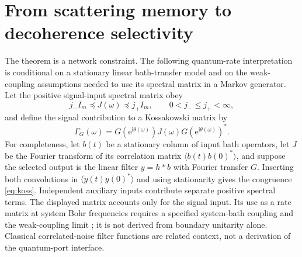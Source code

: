 \documentclass[11pt]{article}
\theoremstyle{definition}
\theoremstyle{remark}
\newcommand{\e}{\mathrm{e}}
\begin{document}
\section{From scattering memory to decoherence selectivity}

The theorem is a network constraint. The following quantum-rate interpretation
is conditional on a stationary linear bath-transfer model and on the
weak-coupling assumptions needed to use its spectral matrix in a Markov
generator. Let the positive signal-input spectral matrix obey
\begin{equation}\label{eq:bath}
 j_-I_m\preceq J(\omega)\preceq j_+I_m,
 \qquad 0<j_-\leq j_+<\infty,
\end{equation}
and define the signal contribution to a Kossakowski matrix by
\begin{equation}\label{eq:koss}
 \Gamma_G(\omega)=G(\e^{\mathrm{i}\theta(\omega)})
 J(\omega)G(\e^{\mathrm{i}\theta(\omega)})^*.
\end{equation}
For completeness, let $b(t)$ be a stationary column of input bath
operators, let $J$ be the Fourier transform of its correlation matrix
$\langle b(t)b(0)^*\rangle$, and suppose the selected output is the linear
filter $y=h*b$ with Fourier transfer $G$. Inserting both convolutions
in $\langle y(t)y(0)^*\rangle$ and using stationarity gives the congruence
\eqref{eq:koss}. Independent auxiliary inputs contribute separate
positive spectral terms. The displayed matrix accounts only for the
signal input. Its use as a rate matrix at system Bohr frequencies requires
a specified system-bath coupling and the weak-coupling limit
\cite{Davies1974}; it is not derived from boundary unitarity alone.
Classical correlated-noise filter functions \cite{CerfontaineEtAl2021} are
related context, not a derivation of the quantum-port interface.
\end{document}
